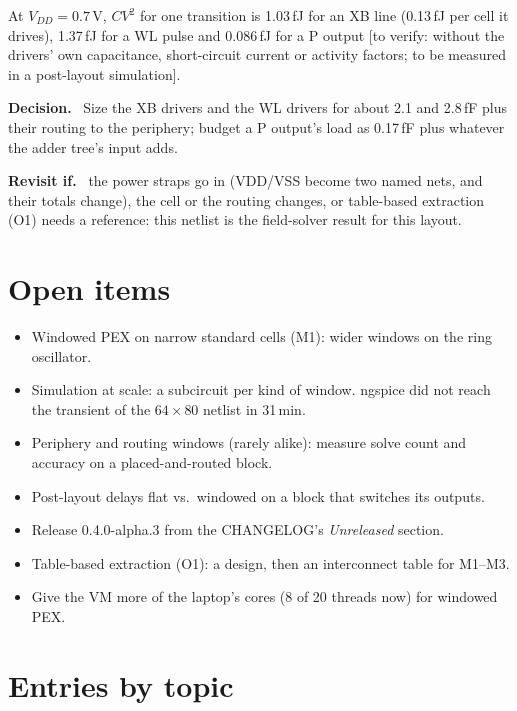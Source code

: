 \documentclass[11pt]{article}
\makeatletter
\def\nb@topics{}
\newcommand{\topicindex}{\ifx\nb@topics\@empty\else
  \section*{Entries by topic}\addcontentsline{toc}{section}{Entries by topic}%
  \begin{description}[style=nextline]\nb@topics\end{description}\fi}
\newcommand{\field}[1]{\par\smallskip\noindent\textbf{#1.}\ }
\newcommand{\verify}[1]{\textcolor{todocol}{[to verify: #1]}}
\makeatother
\begin{document}
At $V_{DD} = 0.7$\,V, $CV^2$ for one transition is 1.03\,fJ for an XB line (0.13\,fJ per cell it drives), 1.37\,fJ for a WL pulse and 0.086\,fJ for a P output \verify{without the drivers' own capacitance, short-circuit current or activity factors; to be measured in a post-layout simulation}.
\field{Decision} Size the XB drivers and the WL drivers for about 2.1 and 2.8\,fF plus their routing to the periphery; budget a P output's load as 0.17\,fF plus whatever the adder tree's input adds.
\field{Revisit if} the power straps go in (VDD/VSS become two named nets, and their totals change), the cell or the routing changes, or table-based extraction (O1) needs a reference: this netlist is the field-solver result for this layout.

\fussy
\section*{Open items}
\begin{itemize}
  \item Windowed PEX on narrow standard cells (M1): wider windows on the ring oscillator.
  \item Simulation at scale: a subcircuit per kind of window. ngspice did not reach the transient of the $64\times80$ netlist in 31\,min.
  \item Periphery and routing windows (rarely alike): measure solve count and accuracy on a placed-and-routed block.
  \item Post-layout delays flat vs.\ windowed on a block that switches its outputs.
  \item Release 0.4.0-alpha.3 from the CHANGELOG's \emph{Unreleased} section.
  \item Table-based extraction (O1): a design, then an interconnect table for M1--M3.
  \item Give the VM more of the laptop's cores (8 of 20 threads now) for windowed PEX.
\end{itemize}

\topicindex
\end{document}
